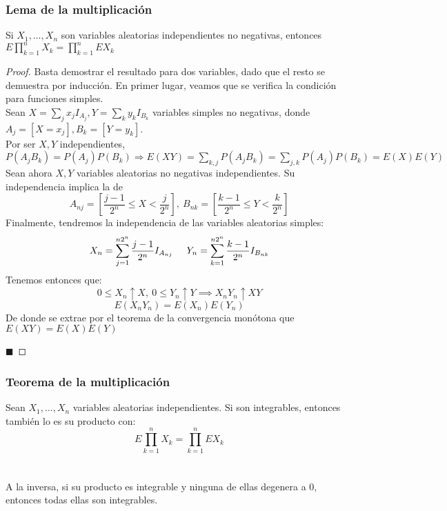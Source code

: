 \documentclass[12pt,a4paper]{book}
\newcommand*{\qed}{\hfill\ensuremath{\blacksquare}}
\begin{document}
\subsubsection{Lema de la multiplicación}
\begin{lemma}
Si $X_1, \ldots , X_n$ son variables aleatorias independientes no negativas, entonces $E\displaystyle\prod_{k=1}^{n}X_k=\displaystyle\prod_{k=1}^{n} E X_k$
\end{lemma}
\begin{proof}
Basta demostrar el resultado para dos variables, dado que el resto se demuestra por inducción. En primer lugar, veamos que se verifica la condición para funciones simples.\\

Sean $X = \sum_j x_j I_{A_j}, Y = \sum_k y_k I_{B_k}$ variables simples no negativas, donde $A_j = [X = x_j], B_k = [Y = y_k]$.\\

Por ser $X,Y$ independientes, $P(A_jB_k) = P(A_j)P(B_k) \Rightarrow E(XY) = \sum_{k,j} P(A_jB_k) = \sum_{j,k} P(A_j)P(B_k) = E(X)E(Y)$\\

Sean ahora $X,Y$ variables aleatorias no negativas independientes. 
Su independencia implica la de
$$ A_{nj} = \left[\frac{j-1}{2^n} \leq X < \frac{j}{2^n}\right],\  B_{nk} = \left[\frac{k-1}{2^n} \leq Y < \frac{k}{2^n}\right]$$
Finalmente, tendremos la independencia de las variables aleatorias simples:
$$ X_n = \sum_{j=1}^{n2^n} \frac {j-1}{2^n}I_{A_{nj}}\hspace{0.5cm} Y_n = \sum_{k=1}^{n2^n} \frac {k-1}{2^n}I_{B_{nk}}$$
Tenemos entonces que:
$$ 0 \leq X_n \uparrow X, \ 0 \leq Y_n \uparrow Y \implies X_nY_n \uparrow XY$$
$$ E(X_nY_n) = E(X_n)E(Y_n)$$
De donde se extrae por el teorema de la convergencia monótona que $E(XY) = E(X)E(Y)$

\qed
\end{proof}

\subsubsection{Teorema de la multiplicación}
\begin{theorem}
Sean $X_1,\ldots, X_n$ variables aleatorias independientes. Si son integrables, entonces también lo es su producto con: $$E\displaystyle\prod_{k=1}^n X_k=\displaystyle\prod_{k=1}^n E X_k$$
\\\\
A la inversa, si su producto es integrable y ninguna de ellas degenera a $0$, entonces todas ellas son integrables.
\end{theorem}
\end{document}

